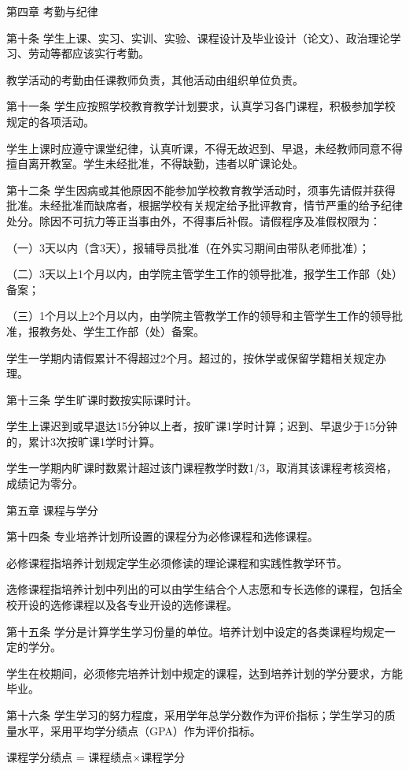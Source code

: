 \documentclass[UTF8,12pt,a4paper]{report}
\begin{document}
第四章  考勤与纪律

第十条  学生上课、实习、实训、实验、课程设计及毕业设计（论文）、政治理论学习、劳动等都应该实行考勤。

教学活动的考勤由任课教师负责，其他活动由组织单位负责。

第十一条  学生应按照学校教育教学计划要求，认真学习各门课程，积极参加学校规定的各项活动。

学生上课时应遵守课堂纪律，认真听课，不得无故迟到、早退，未经教师同意不得擅自离开教室。学生未经批准，不得缺勤，违者以旷课论处。

第十二条  学生因病或其他原因不能参加学校教育教学活动时，须事先请假并获得批准。未经批准而缺席者，根据学校有关规定给予批评教育，情节严重的给予纪律处分。除因不可抗力等正当事由外，不得事后补假。请假程序及准假权限为：

（一）3天以内（含3天），报辅导员批准（在外实习期间由带队老师批准）；

（二）3天以上1个月以内，由学院主管学生工作的领导批准，报学生工作部（处）备案；

（三）1个月以上2个月以内，由学院主管教学工作的领导和主管学生工作的领导批准，报教务处、学生工作部（处）备案。

学生一学期内请假累计不得超过2个月。超过的，按休学或保留学籍相关规定办理。

第十三条  学生旷课时数按实际课时计。

学生上课迟到或早退达15分钟以上者，按旷课1学时计算；迟到、早退少于15分钟的，累计3次按旷课1学时计算。

学生一学期内旷课时数累计超过该门课程教学时数1/3，取消其该课程考核资格，成绩记为零分。



第五章  课程与学分

第十四条  专业培养计划所设置的课程分为必修课程和选修课程。

必修课程指培养计划规定学生必须修读的理论课程和实践性教学环节。

选修课程指培养计划中列出的可以由学生结合个人志愿和专长选修的课程，包括全校开设的选修课程以及各专业开设的选修课程。

第十五条  学分是计算学生学习份量的单位。培养计划中设定的各类课程均规定一定的学分。

学生在校期间，必须修完培养计划中规定的课程，达到培养计划的学分要求，方能毕业。

第十六条  学生学习的努力程度，采用学年总学分数作为评价指标；学生学习的质量水平，采用平均学分绩点（GPA）作为评价指标。

课程学分绩点 = 课程绩点$\times$课程学分
\end{document}
